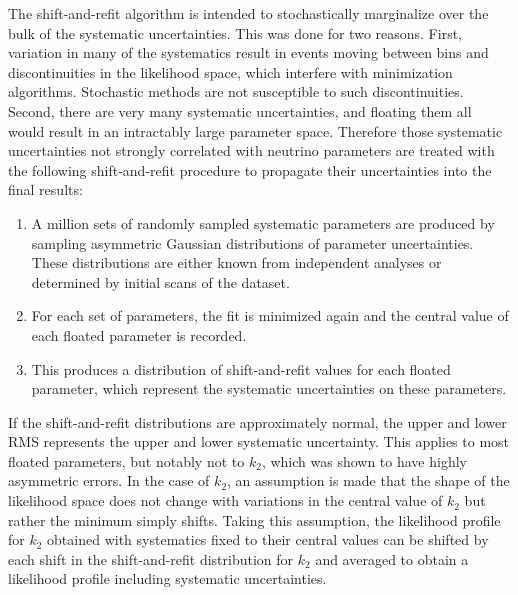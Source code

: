 The shift-and-refit algorithm is intended to stochastically marginalize over the bulk of the systematic uncertainties. 
This was done for two reasons.
First, variation in many of the systematics result in events moving between bins and discontinuities in the likelihood space, which interfere with minimization algorithms.
Stochastic methods are not susceptible to such discontinuities.
Second, there are very many systematic uncertainties, and floating them all would result in an intractably large parameter space.
Therefore those systematic uncertainties not strongly correlated with neutrino parameters are treated with the following shift-and-refit procedure to propagate their uncertainties into the final results:
\begin{enumerate}
    \item A million sets of randomly sampled systematic parameters are produced by sampling asymmetric Gaussian distributions of parameter uncertainties. These distributions are either known from independent analyses or determined by initial scans of the dataset. 
    \item For each set of parameters, the fit is minimized again and the central value of each floated parameter is recorded.
    \item This produces a distribution of shift-and-refit values for each floated parameter, which represent the systematic uncertainties on these parameters.
\end{enumerate}

If the shift-and-refit distributions are approximately normal, the upper and lower RMS represents the upper and lower systematic uncertainty. 
This applies to most floated parameters, but notably not to $k_2$, which was shown to have highly asymmetric errors. 
In the case of $k_2$, an assumption is made that the shape of the likelihood space does not change with variations in the central value of $k_2$ but rather the minimum simply shifts.
Taking this assumption, the likelihood profile for $k_2$ obtained with systematics fixed to their central values can be shifted by each shift in the shift-and-refit distribution for $k_2$ and averaged to obtain a likelihood profile including systematic uncertainties.

